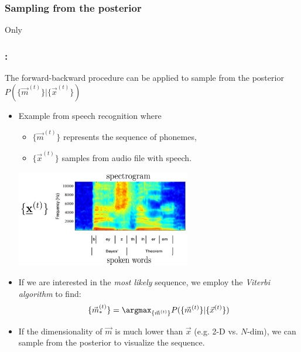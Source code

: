 \subsubsection{Sampling from the posterior}

\begin{frame}{Only}
\frametitle{\subsecname:~\subsubsecname}

The forward-backward procedure can be applied to sample from the posterior
$
P(\{\vec m^{(t)} \} | \{\vec x^{(t)}\} )
$

\begin{itemize}
\item<only@1>
Example from speech recognition where
\begin{itemize}
\item $\{\vec m^{(t)} \}$ represents the sequence of phonemes,
\item $\{\vec x^{(t)} \}$ samples from audio file with speech.
\end{itemize}

\begin{center}
	\includegraphics[width=0.6\textwidth]{img/Bishop_13-1}
\end{center}

\item<only@2> If we are interested in the \emph{most likely} sequence, we employ the \emph{Viterbi algorithm}
to find:
\begin{equation}
\{\vec m_*^{(t)} \} = 
\argmax_{\{\vec m^{(t)} \}} P(\{\vec m^{(t)} \} | \{\vec x^{(t)}\} )
\end{equation}

\item<only@3>
If the dimensionality of $\vec m$ is much lower than $\vec x$ (e.g. 2-D vs. $N$-dim), we can sample from the posterior to visualize the sequence.

\end{itemize}

\end{frame}

